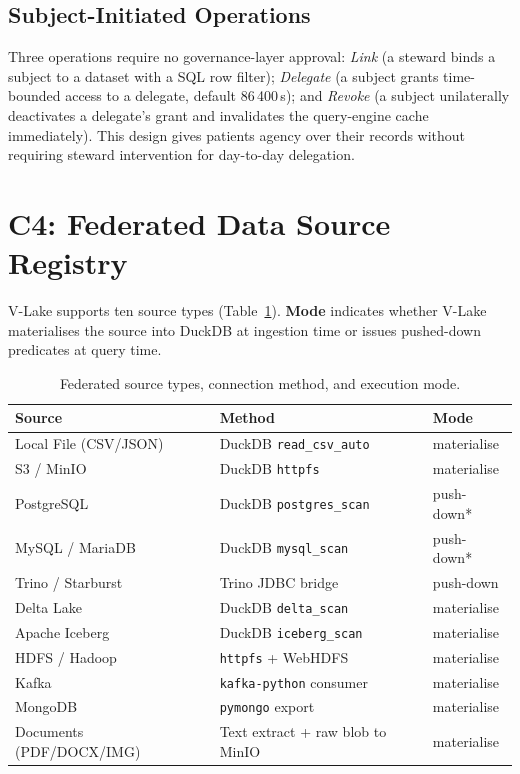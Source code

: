 \documentclass[10pt,twocolumn]{article}
\begin{document}
\subsection{Subject-Initiated Operations}

Three operations require no governance-layer approval:
\emph{Link} (a steward binds a subject to a dataset with a SQL row
filter); \emph{Delegate} (a subject grants time-bounded access to
a delegate, default 86\,400\,s); and \emph{Revoke} (a subject
unilaterally deactivates a delegate's grant and invalidates the
query-engine cache immediately). This design gives patients agency
over their records without requiring steward intervention for
day-to-day delegation.


\section{C4: Federated Data Source Registry}
\label{sec:federation}

V-Lake supports ten source types (Table~\ref{tab:sources}).
\textbf{Mode} indicates whether V-Lake materialises the source into
DuckDB at ingestion time or issues pushed-down predicates at query
time.

\begin{table}[t]
\centering
\footnotesize
\caption{Federated source types, connection method, and execution
mode.}
\label{tab:sources}
\setlength{\tabcolsep}{3pt}
\begin{tabular}{@{}p{2.3cm} p{3.3cm} p{1.5cm}@{}}
\toprule
\textbf{Source} & \textbf{Method} & \textbf{Mode} \\
\midrule
Local File (CSV/JSON) & DuckDB \texttt{read\_csv\_auto} & materialise \\
S3 / MinIO            & DuckDB \texttt{httpfs}          & materialise \\
PostgreSQL            & DuckDB \texttt{postgres\_scan}  & push-down* \\
MySQL / MariaDB       & DuckDB \texttt{mysql\_scan}     & push-down* \\
Trino / Starburst     & Trino JDBC bridge               & push-down \\
Delta Lake            & DuckDB \texttt{delta\_scan}     & materialise \\
Apache Iceberg        & DuckDB \texttt{iceberg\_scan}   & materialise \\
HDFS / Hadoop         & \texttt{httpfs} + WebHDFS       & materialise \\
Kafka                 & \texttt{kafka-python} consumer  & materialise \\
MongoDB               & \texttt{pymongo} export         & materialise \\
\midrule
Documents (PDF/DOCX/IMG)
  & Text extract + raw blob to MinIO
  & materialise \\
\bottomrule
\end{tabular}
\end{table}
\end{document}
